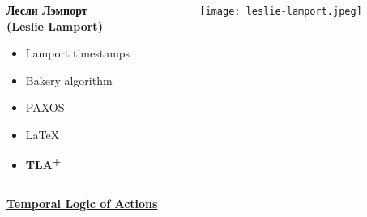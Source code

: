 \documentclass[
  11pt,aspectratio=169,pdf,hyperref={unicode,colorlinks=false}
]{beamer}
\def\TLA{TLA\textsuperscript{+}}
\begin{document}
\begin{frame}[c]
  \begin{columns}
    \begin{column}{.45\textwidth}
      {\Large\bf
        Лесли Лэмпорт\\
        (\href{https://lamport.azurewebsites.net}{Leslie Lamport})
      }\\
      \vspace{3ex}
      \large
      \vspace{1ex}
      \begin{itemize}
        \item Lamport timestamps
        \item Bakery algorithm
        \item PAXOS
        \item LaTeX
        \item {\bf \TLA}
      \end{itemize}
    \end{column}
    \begin{column}{.5\textwidth}
      \centering
      \texttt{[image: leslie-lamport.jpeg]}
    \end{column}
  \end{columns}
\end{frame}

\begin{frame}[c]
  \centering\Large\bf
  \href{https://lamport.azurewebsites.net/pubs/lamport-actions.pdf}{Temporal Logic of Actions}
\end{frame}
\end{document}
